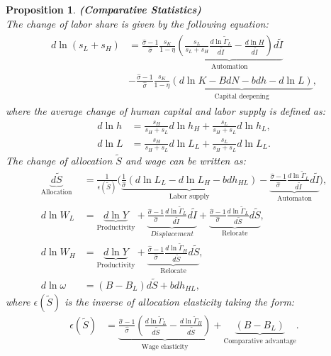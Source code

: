 \documentclass[12pt]{article}
\newtheorem{proposition}{Proposition}
\begin{document}
\begin{proposition}{\bf (Comparative Statistics)} \\
The change of labor share is given by the following equation: 
\begin{align}
\label{ds_L}
\begin{split}
d\ln(s_{L}+s_{H}) &= \frac{\hat{\sigma}-1}{\hat{\sigma}}\frac{s_K}{1-\eta}\underbrace{( \frac{s_L}{s_L+s_H}\frac{d\ln\tilde{\Gamma}_L}{d\tilde{I}}-\frac{d\ln H}{d\tilde{I}})d\tilde{I}}_{\text{Automation}}\\
&-\frac{\hat{\sigma}-1}{\hat{\sigma}}\frac{s_K}{1-\eta}\underbrace{(d\ln K -BdN-bdh-d\ln L)}_{\text{Capital deepening}},
 \end{split}
\end{align}
where the average change of human capital and labor supply is defined as: 
\begin{align*}
d\ln h &= \frac{s_H}{s_H+s_L}d\ln h_H+\frac{s_L}{s_H+s_L}d\ln h_L,\\
d\ln L &= \frac{s_H}{s_H+s_L}d\ln L_L+\frac{s_L}{s_H+s_L}d\ln L_L.
\end{align*}
The change of allocation $\tilde{S}$ and wage can be written as: 
\begin{align}
\label{dS}
\underbrace{d\tilde{S}}_{\text{Allocation}} &= \frac{1}{\epsilon(\tilde{S})}\Big(\underbrace{\frac{1}{\hat{\sigma}}(d\ln L_L-d\ln L_H-bdh_{HL})}_{\text{Labor supply}}-\underbrace{\frac{\hat{\sigma}-1}{\hat{\sigma}}\frac{d\ln\tilde{\Gamma}_L}{d\tilde{I}}d\tilde{I}}_{\text{Automaton}}\Big),\\ 
\label{dW_L}
d \ln W_L &= \underbrace{d \ln Y}_{\text{Productivity}} + \underbrace{\frac{\hat{\sigma}-1}{\hat{\sigma}}\frac{d\ln\tilde{\Gamma}_L}{d\tilde{I}}d\tilde{I}}_{Displacement}+ \underbrace{\frac{\hat{\sigma}-1}{\hat{\sigma}}\frac{d\ln\tilde{\Gamma}_L}{d\tilde{S}}d\tilde{S}}_{\text{Relocate}},\\
\label{dW_H}
d \ln W_H &= \underbrace{d \ln Y}_{\text{Productivity}}  + \underbrace{\frac{\hat{\sigma}-1}{\hat{\sigma}}\frac{d\ln\tilde{\Gamma}_H}{d\tilde{S}}d\tilde{S}}_{\text{Relocate}}, \\
\label{dw}
d \ln \omega &=(B-B_L)d\tilde{S}+bdh_{HL},
\end{align}
where $\epsilon(\tilde{S})$ is the inverse of allocation elasticity taking the form:  
\begin{align}
\label{eS}
\epsilon(\tilde{S})&= \underbrace{\frac{\hat{\sigma}-1}{\hat{\sigma}}(\frac{d\ln \tilde{\Gamma}_L}{d\tilde{S}}-\frac{d\ln \tilde{\Gamma}_H}{d\tilde{S}})}_{\text{Wage elasticity}}
								 +\underbrace{(B-B_L)}_{\text{Comparative advantage}}.
\end{align}
\end{proposition}
\end{document}
